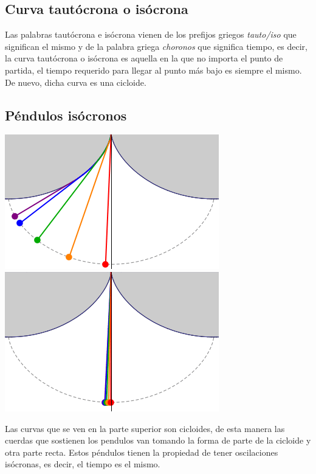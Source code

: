 \documentclass{article}
\begin{document}
\subsection{Curva tautócrona o isócrona}
Las palabras tautócrona e isócrona vienen de los prefijos griegos \textit{tauto/iso} que significan el mismo y de la palabra griega
\textit{choronos} que significa tiempo, es decir, la curva tautócrona o isócrona es aquella en la que no importa el punto de partida,
el tiempo requerido para llegar al punto más bajo es siempre el mismo. De nuevo, dicha curva es una cicloide.
\subsection{Péndulos isócronos}
\begin{center}
    \includegraphics[scale=0.5]{figuras/pend 1.PNG}\\
    \includegraphics[scale=0.5]{figuras/pend 2.PNG}
\end{center}
Las curvas que se ven en la parte superior son cicloides, de esta manera las cuerdas que sostienen los pendulos van tomando la
forma de parte de la cicloide y otra parte recta. Estos péndulos tienen la propiedad de tener oscilaciones isócronas, es decir,
el tiempo es el mismo.
\end{document}
